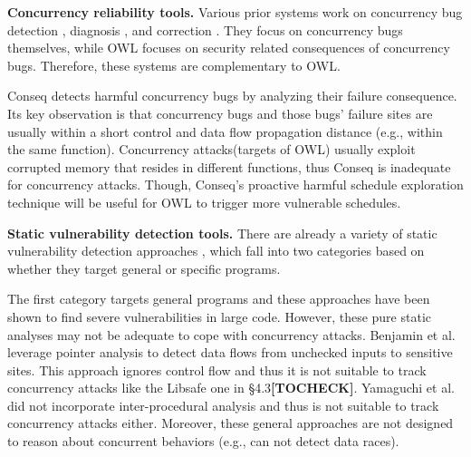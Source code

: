 \noindent
\textbf{Concurrency reliability tools.} Various prior systems work
on concurrency bug detection \cite{yu:racetrack:sosp,savage:eraser,racerx:sosp03,lu:muvi:sosp,avio:asplos06,conmem:asplos10,conseq:asplos11,kasikci2013racemob,wester:parallelizing:asplos13}, diagnosis \cite{racefuzzer:pldi08,ctrigger:asplos09,atomfuzzer:fse08,attariyan2012x,failure:sketch:sosp15}, and correction \cite{deadlock-immunity:osdi08,gadara:osdi08,wu:loom:osdi10,automated:osdi}. They focus on concurrency bugs themselves, while
OWL focuses on security related consequences of concurrency
bugs. Therefore, these systems are complementary to OWL.

Conseq \cite{conseq:asplos11} detects harmful concurrency bugs by analyzing
their failure consequence. Its key observation is that concurrency
bugs and those bugs' failure sites are usually within a
short control and data flow propagation distance (e.g., within
the same function). Concurrency attacks(targets of OWL)
usually exploit corrupted memory that resides in different
functions, thus Conseq is inadequate for concurrency attacks.
Though, Conseq’s proactive harmful schedule exploration technique
will be useful for OWL to trigger more vulnerable schedules.

\noindent
\textbf{Static vulnerability detection tools.} There are already a variety
of static vulnerability detection approaches \cite{livshits05finding,yamaguchi2014modeling,felmetsger2010toward,felmetsger2010toward,srivastava2011security,zhang:usenix:sec02}, which fall into two categories based
on whether they target general or specific programs.

The first category \cite{livshits05finding,yamaguchi2014modeling} targets general programs and
these approaches have been shown to find severe vulnerabilities
in large code. However, these pure static analyses may
not be adequate to cope with concurrency attacks. Benjamin
et al. \cite{livshits05finding} leverage pointer analysis to detect data flows from
unchecked inputs to sensitive sites. This approach ignores
control flow and thus it is not suitable to track concurrency
attacks like the Libsafe one in §4.3\textbf{[TOCHECK]}. Yamaguchi et al. \cite{yamaguchi2014modeling}
did not incorporate inter-procedural analysis and thus is not
suitable to track concurrency attacks either. Moreover, these
general approaches are not designed to reason about concurrent
behaviors (e.g., \cite{yamaguchi2014modeling} can not detect data races).

